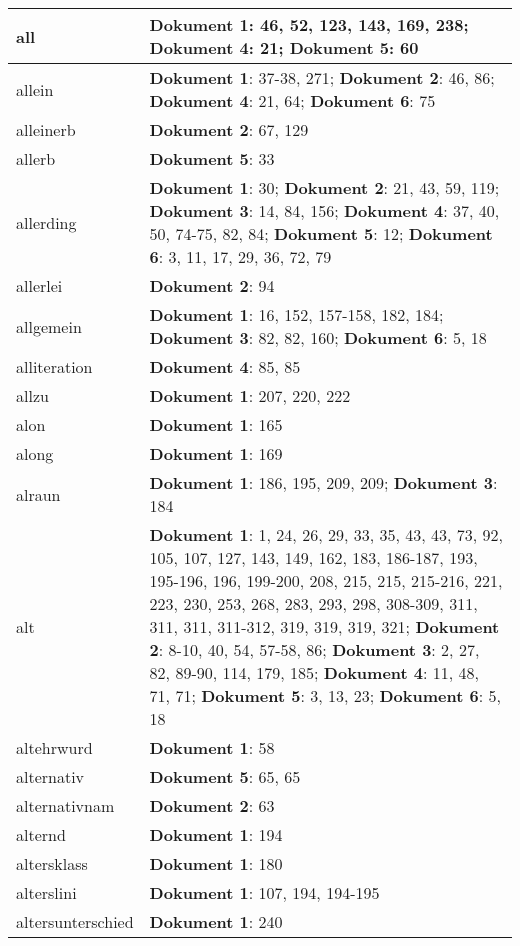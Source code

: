 \documentclass[a5paper]{article}
\begin{document}
\begin{longtable}[l]{|l|p{3in}|}
\hline
all & \textbf{Dokument 1}: 46, 52, 123, 143, 169, 238; \textbf{Dokument 4}: 21; \textbf{Dokument 5}: 60 \\
\hline
allein & \textbf{Dokument 1}: 37-38, 271; \textbf{Dokument 2}: 46, 86; \textbf{Dokument 4}: 21, 64; \textbf{Dokument 6}: 75 \\
\hline
alleinerb & \textbf{Dokument 2}: 67, 129 \\
\hline
allerb & \textbf{Dokument 5}: 33 \\
\hline
allerding & \textbf{Dokument 1}: 30; \textbf{Dokument 2}: 21, 43, 59, 119; \textbf{Dokument 3}: 14, 84, 156; \textbf{Dokument 4}: 37, 40, 50, 74-75, 82, 84; \textbf{Dokument 5}: 12; \textbf{Dokument 6}: 3, 11, 17, 29, 36, 72, 79 \\
\hline
allerlei & \textbf{Dokument 2}: 94 \\
\hline
allgemein & \textbf{Dokument 1}: 16, 152, 157-158, 182, 184; \textbf{Dokument 3}: 82, 82, 160; \textbf{Dokument 6}: 5, 18 \\
\hline
alliteration & \textbf{Dokument 4}: 85, 85 \\
\hline
allzu & \textbf{Dokument 1}: 207, 220, 222 \\
\hline
alon & \textbf{Dokument 1}: 165 \\
\hline
along & \textbf{Dokument 1}: 169 \\
\hline
alraun & \textbf{Dokument 1}: 186, 195, 209, 209; \textbf{Dokument 3}: 184 \\
\hline
alt & \textbf{Dokument 1}: 1, 24, 26, 29, 33, 35, 43, 43, 73, 92, 105, 107, 127, 143, 149, 162, 183, 186-187, 193, 195-196, 196, 199-200, 208, 215, 215, 215-216, 221, 223, 230, 253, 268, 283, 293, 298, 308-309, 311, 311, 311, 311-312, 319, 319, 319, 321; \textbf{Dokument 2}: 8-10, 40, 54, 57-58, 86; \textbf{Dokument 3}: 2, 27, 82, 89-90, 114, 179, 185; \textbf{Dokument 4}: 11, 48, 71, 71; \textbf{Dokument 5}: 3, 13, 23; \textbf{Dokument 6}: 5, 18 \\
\hline
altehrwurd & \textbf{Dokument 1}: 58 \\
\hline
alternativ & \textbf{Dokument 5}: 65, 65 \\
\hline
alternativnam & \textbf{Dokument 2}: 63 \\
\hline
alternd & \textbf{Dokument 1}: 194 \\
\hline
altersklass & \textbf{Dokument 1}: 180 \\
\hline
alterslini & \textbf{Dokument 1}: 107, 194, 194-195 \\
\hline
altersunterschied & \textbf{Dokument 1}: 240 \\

\end{longtable}
\end{document}
